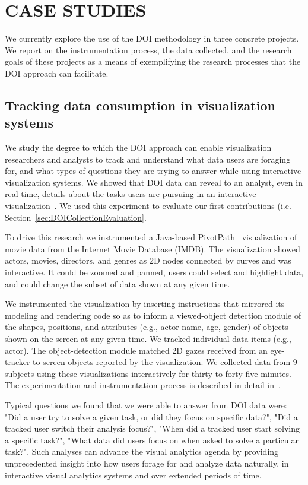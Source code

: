 \chapter{CASE STUDIES}
\label{chap:CaseStudies}

We currently explore the use of the DOI methodology in three concrete projects. We report on the instrumentation process, the data collected, and the research goals of these projects as a means of exemplifying the research processes that the DOI approach can facilitate.  

\section{Tracking data consumption in visualization systems}

We study the degree to which the DOI approach can enable visualization researchers and analysts to track and understand what data users are foraging for, and what types of questions they are trying to answer while using interactive visualization systems. We showed that DOI data can reveal to an analyst, even in real-time, details about the tasks users are pursuing in an interactive visualization~\cite{Ala16, alam2015they}. We used this experiment to evaluate our first contributions (i.e. Section~\ref{sec:DOICollectionEvaluation}. 

To drive this research we instrumented a Java-based PivotPath~\cite{Dor12} visualization of movie data from the Internet Movie Database (IMDB). The visualization showed actors, movies, directors, and genres as 2D nodes connected by curves and was interactive. It could be zoomed and panned, users could select and highlight data, and could change the subset of data shown at any given time. 

We instrumented the visualization by inserting instructions that mirrored its modeling and rendering code so as to inform a viewed-object detection module of the shapes, positions, and attributes (e.g., actor name, age, gender) of objects shown on the screen at any given time. We tracked individual data items (e.g., actor). The object-detection module matched 2D gazes received from an eye-tracker to screen-objects reported by the visualization. We collected data from $9$ subjects using these visualizations interactively for thirty to forty five minutes. The experimentation and instrumentation process is described in detail in~\cite{Ala16}.

Typical questions we found that we were able to answer from DOI data were: "Did a user try to solve a given task, or did they focus on specific data?", "Did a tracked user switch their analysis focus?", "When did a tracked user start solving a specific task?", "What data did users focus on when asked to solve a particular task?". Such analyses can advance the visual analytics agenda by providing unprecedented insight into how users forage for and analyze data naturally, in interactive visual analytics systems and over extended periods of time. 

